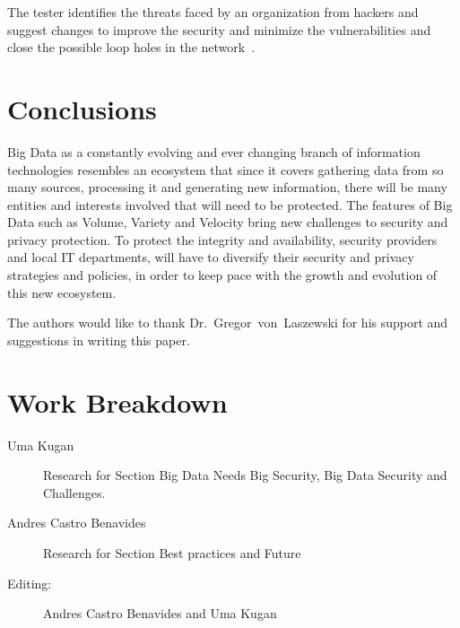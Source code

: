 The  tester identifies the threats faced by an organization from
hackers and suggest changes to improve the security and minimize
the vulnerabilities and close the possible loop holes in the
network~\cite{shivayogimathoverview}.


\section{Conclusions}

Big Data as a constantly evolving and ever changing branch of
information technologies resembles an ecosystem that since
it covers gathering data from so many sources, processing
it and generating new information, there will be many entities 
and interests involved that will need to be protected. The 
features of Big Data such as Volume, Variety and Velocity
bring new challenges to security and privacy protection. 
To protect the integrity and availability, security providers
and local IT departments, will have to diversify their security
and privacy strategies and policies, in order to keep pace with
the growth and evolution of this new ecosystem.

\begin{acks}
The authors would like to thank Dr.~Gregor~von~Laszewski for his 
support and suggestions in writing this paper.
\end{acks}




\newpage

\appendix

\section{Work Breakdown}

\begin{description}

\item [Uma Kugan] Research for Section Big Data Needs Big Security, Big Data Security and Challenges.

\item[Andres Castro Benavides] Research for Section Best practices and Future

\item[Editing:] Andres Castro Benavides and Uma Kugan

\end{description}


